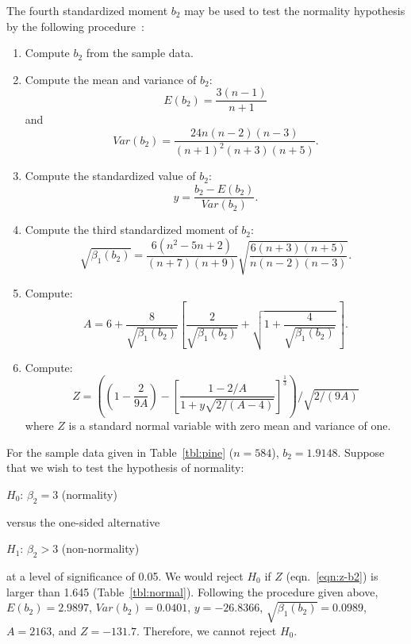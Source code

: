 \documentclass[draft]{article}
\newenvironment{example}{%
   \vspace{\baselineskip}
   \par\noindent\hrulefill\par
   \noindent{\em Example:}}{%
   \par\noindent\hrulefill\par
   \vspace{\baselineskip}}
\begin{document}
The fourth standardized moment \(b_2\) may be used to
test the normality hypothesis by the following 
procedure~\cite{anscombe63}:
\begin{enumerate}
\item Compute \(b_2\) from the sample data.
\item Compute the mean and variance of \(b_2\):
\begin{equation}
E\left(b_2\right) = \frac{3\left(n-1\right)}{n+1}
\end{equation}
and
\begin{equation}
Var\left(b_2\right) = \frac{24n\left(n-2\right)\left(n-3\right)}
{\left(n+1\right)^2\left(n+3\right)\left(n+5\right)}.
\end{equation}
\item Compute the standardized value of \(b_2\):
\begin{equation}
y = \frac{b_2-E\left(b_2\right)}{Var\left(b_2\right)}.
\end{equation}
\item Compute the third standardized moment of \(b_2\):
\begin{equation}
\sqrt{\beta_1\left(b_2\right)} = 
\frac{6\left(n^2-5n+2\right)}{\left(n+7\right)\left(n+9\right)}
\sqrt{\frac{6\left(n+3\right)\left(n+5\right)}
           {n\left(n-2\right)\left(n-3\right)}}.
\end{equation}
\item Compute:
\begin{equation}
A=6+\frac{8}{\sqrt{\beta_1\left(b_2\right)}}\left[
\frac{2}{\sqrt{\beta_1\left(b_2\right)}} +
\sqrt{1+\frac{4}{\sqrt{\beta_1\left(b_2\right)}}}\,\right].
\end{equation}
\item Compute:
\begin{equation}
\label{eqn:z-b2}
Z = \left(\left(1-\frac{2}{9A}\right)-
\left[\frac{1-2/A}{1+y\sqrt{2/\left(A-4\right)}}\right]^{\frac{1}{3}}\right)/
\sqrt{2/\left(9A\right)}
\end{equation}
where \(Z\) is a standard normal variable with
zero mean and variance of one.
\end{enumerate}

\begin{example}
For the sample data given in Table~\ref{tbl:pine} (\(n=584\)), 
\(b_2 =1.9148\).  Suppose that we wish to test the
hypothesis of normality:

\(H_0\): \(\beta_2=3\) (normality)

\noindent versus the one-sided alternative

\(H_1\): \(\beta_2>3\) (non-normality)

\noindent at a level of significance of 0.05. We would
reject \(H_0\) if \(Z\) (eqn.~\ref{eqn:z-b2}) is larger
than 1.645 (Table~\ref{tbl:normal}).  Following the procedure given above,
\(E\left(b_2\right)=2.9897\), 
\(Var\left(b_2\right)=0.0401\),
\(y=-26.8366\), 
\(\sqrt{\beta_1\left(b_2\right)}=0.0989\),
\(A=2163\), and
\(Z=-131.7\).
Therefore, we cannot reject \(H_0\).
\end{example}
\end{document}
